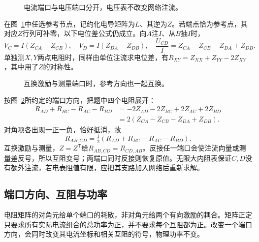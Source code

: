\begin{figure}[H]\centering
{}
\caption{电流端口与电压端口分开，电压表不改变网络注流。}\label{fig:c2-four-terminal-q}
\end{figure}
\begin{solution}
在图~\ref{fig:c2-four-terminal-q}中任选参考节点，记约化电导矩阵为$L$、其逆为$Z$。若端点恰为参考点，其对应$Z$行列可补零，以下电位差公式仍成立。向$A$注$I$、从$B$抽$I$时，
\[
 V_C=I(Z_{CA}-Z_{CB}),\quad V_D=I(Z_{DA}-Z_{DB}),\quad
 \frac{U_{CD}}I=Z_{CA}-Z_{CB}-Z_{DA}+Z_{DB}.
\]
单独测$X,Y$两点电阻时，同样由单位注流求电位差，有$R_{XY}=Z_{XX}+Z_{YY}-2Z_{XY}$，其中用了$Z$的对称性。
\begin{figure}[H]\centering
{}
\caption{互换激励与测量端口时，参考方向也一起互换。}\label{fig:c2-four-terminal-s}
\end{figure}
按图~\ref{fig:c2-four-terminal-s}所约定的端口方向，把题中四个电阻展开：
\[
 \begin{aligned}
 R_{AD}+R_{BC}-R_{AC}-R_{BD}
 &=-2Z_{AD}-2Z_{BC}+2Z_{AC}+2Z_{BD}\\
 &=2(Z_{CA}-Z_{CB}-Z_{DA}+Z_{DB}).
 \end{aligned}
\]
对角项各出现一正一负，恰好抵消，故
\[
 \boxed{R_{AB,CD}=\tfrac12(R_{AD}+R_{BC}-R_{AC}-R_{BD})}.
\]
互换激励与测量，$Z=Z^{\mathsf T}$给$R_{AB,CD}=R_{CD,AB}$。反接任一端口会使注流向量或测量差反号，所以互阻变号；两端口同时反接则恢复原值。无限大内阻表保证$C,D$没有额外注流，若电表阻值有限，应把其支路加入网络后重新求解。
\end{solution}

\subsection{端口方向、互阻与功率}
电阻矩阵的对角元给单个端口的耗散，非对角元给两个有向激励的耦合。矩阵正定只要求所有实际电流组合的总功率为正，并不要求每个互阻都为正。改变一个端口方向，会同时改变其电流坐标和相关互阻的符号，物理功率不变。


